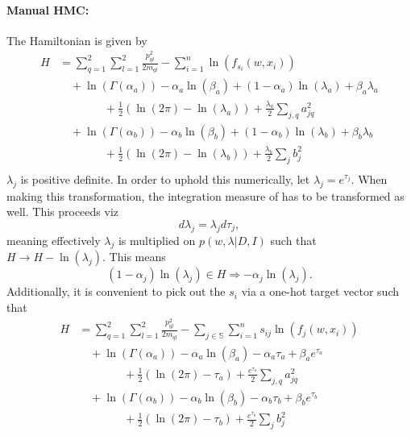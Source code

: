\begin{example}
	\paragraph{Manual HMC:}	The Hamiltonian is given by
	\begin{equation}
		\begin{split}
			H&=\sum_{q=1}^{2}\sum_{l=1}^{2}\frac{p_{ql}^2}{2m_{ql}}-\sum_{i=1}^{n}\ln(f_{s_i}(w,x_i))\\
			&\quad+\ln(\Gamma(\alpha_a))-\alpha_a\ln(\beta_a)+(1-\alpha_a)\ln(\lambda_a)+\beta_a\lambda_a\\
			&\qquad \qquad+\frac{1}{2}(\ln(2\pi)-\ln(\lambda_a))+\frac{\lambda_a}{2}\sum_{j,q}a_{jq}^2\\
			&\quad+\ln(\Gamma(\alpha_b))-\alpha_b\ln(\beta_b)+(1-\alpha_b)\ln(\lambda_b)+\beta_b\lambda_b\\
			&\qquad \qquad+\frac{1}{2}(\ln(2\pi)-\ln(\lambda_b))+\frac{\lambda_b}{2}\sum_{j}b_j^2\\
		\end{split}
	\end{equation}
	$\lambda_j$ is positive definite. In order to uphold this numerically, let $\lambda_j = e^{\tau_j}$. When making this transformation, the integration measure of  has to be transformed as well. This proceeds viz
	\begin{equation}
		d\lambda_j = \lambda_jd\tau_j,
	\end{equation}
	meaning effectively $\lambda_j$ is multiplied on $p(w,\lambda|D,I)$ such that $H \rightarrow H-\ln(\lambda_j)$. This means
	\begin{equation}
		(1-\alpha_j)\ln(\lambda_j)\in H \Rightarrow -\alpha_j \ln(\lambda_j).
	\end{equation}
	Additionally, it is convenient to pick out the $s_i$ via a one-hot target vector such that
	\begin{equation}
		\begin{split}
			H&=\sum_{q=1}^{2}\sum_{l=1}^{2}\frac{p_{ql}^2}{2m_{ql}}-\sum_{j\in \mathbb{S}}\sum_{i=1}^{n}s_{ij}\ln(f_{j}(w,x_i))\\
			&\quad+\ln(\Gamma(\alpha_a))-\alpha_a\ln(\beta_a)-\alpha_a\tau_a+\beta_ae^{\tau_a}\\
			&\qquad \qquad+\frac{1}{2}(\ln(2\pi)-\tau_a)+\frac{e^{\tau_a}}{2}\sum_{j,q}a_{jq}^2\\
			&\quad+\ln(\Gamma(\alpha_b))-\alpha_b\ln(\beta_b)-\alpha_b\tau_b+\beta_be^{\tau_b}\\
			&\qquad \qquad+\frac{1}{2}(\ln(2\pi)-\tau_b)+\frac{e^{\tau_b}}{2}\sum_{j}b_j^2\\
		\end{split}
	\end{equation}
	

\end{example}
